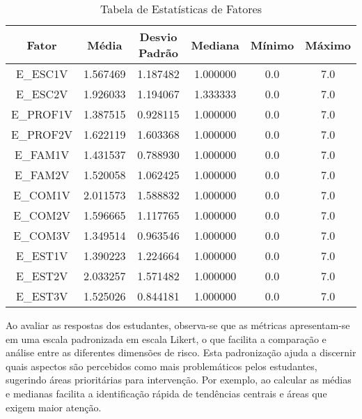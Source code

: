


\begin{table}[ht]
    \centering
    \caption{Tabela de Estatísticas de Fatores}
    \label{tab:fatores}
    \begin{tabular}{|c|c|c|c|c|c|}
        \hline
        \textbf{Fator} & \textbf{Média} & \textbf{Desvio Padrão} & \textbf{Mediana} & \textbf{Mínimo} & \textbf{Máximo} \\
        \hline
        E\_ESC1V & 1.567469 & 1.187482 & 1.000000 & 0.0 & 7.0\\
        E\_ESC2V & 1.926033 & 1.194067 & 1.333333 & 0.0 & 7.0\\
        E\_PROF1V & 1.387515 & 0.928115 & 1.000000 & 0.0 & 7.0 \\
        E\_PROF2V & 1.622119 & 1.603368 & 1.000000 & 0.0 & 7.0 \\
        E\_FAM1V & 1.431537 & 0.788930 & 1.000000 & 0.0 & 7.0\\
        E\_FAM2V & 1.520058 & 1.062425 & 1.000000 & 0.0 & 7.0\\
        E\_COM1V & 2.011573 & 1.588832 & 1.000000 & 0.0 & 7.0\\
        E\_COM2V & 1.596665 & 1.117765 & 1.000000 & 0.0 & 7.0\\
        E\_COM3V & 1.349514 & 0.963546 & 1.000000 & 0.0 & 7.0\\
        E\_EST1V & 1.390223 & 1.224664 & 1.000000 & 0.0 & 7.0\\
        E\_EST2V & 2.033257 & 1.571482 & 1.000000 & 0.0 & 7.0\\
        E\_EST3V & 1.525026 & 0.844181 & 1.000000 & 0.0 & 7.0\\
        \hline
    \end{tabular}
\end{table}




Ao avaliar as respostas dos estudantes, observa-se que as métricas apresentam-se em uma escala padronizada em escala Likert, o que facilita a comparação e análise entre as diferentes dimensões de risco. Esta padronização ajuda a discernir quais aspectos são percebidos como mais problemáticos pelos estudantes, sugerindo áreas prioritárias para intervenção. Por exemplo, ao calcular as médias e medianas facilita a identificação rápida de tendências centrais e áreas que exigem maior atenção.

